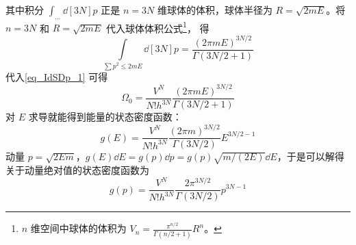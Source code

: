 其中积分 $\int_{\dots} \dd[3N]{p} $ 正是 $n=3N$ 维球体的体积，球体半径为 $R = \sqrt{2mE}$。将 $n=3N$ 和 $R = \sqrt{2mE} $ 代入球体体积公式\footnote{$n$ 维空间中球体的体积为
$V_n = \frac{\pi^{n/2}}{\Gamma(n/2+1)}R^n$。}， 得
\begin{equation}
\int\limits_{\sum p^2 \leqslant 2mE} \dd[3N]{p} = \frac{(2\pi mE)^{3N/2}}{\Gamma(3N/2+1)}
\end{equation}
代入\autoref{eq_IdSDp_1} 可得
\begin{equation}\label{eq_IdSDp_2}
\Omega_0 = \frac{V^N}{N! h^{3N}} \frac{(2\pi mE)^{3N/2}}{\Gamma(3N/2+1)}
\end{equation}
对 $E$ 求导就能得到能量的状态密度函数：
\begin{equation}\label{eq_IdSDp_3}
g(E) = \frac{V^N}{N! h^{3N}} \frac{(2\pi m)^{3N/2}}{\Gamma(3N/2)} E^{3N/2 - 1}
\end{equation}
动量 $p=\sqrt{2Em}$，$g(E)\dd E=g(p)\dd p=g(p)\sqrt{m/(2E)}\dd E$，于是可以解得关于动量绝对值的状态密度函数为
\begin{equation}\label{eq_IdSDp_4}
g(p) = \frac{V^N}{N! h^{3N}} \frac{2\pi^{3N/2}}{\Gamma(3N/2)} p^{3N - 1}
\end{equation}